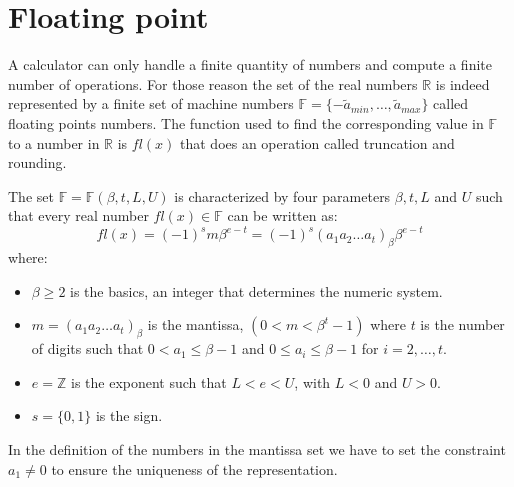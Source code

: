 \documentclass[12pt, a4paper]{report}
\theoremstyle{remark}
\begin{document}
\section{Floating point}
A calculator can only handle a finite quantity of numbers and compute a finite number of operations. For those reason the set of the real numbers 
$\mathbb{R}$ is indeed represented by a finite set of machine numbers $\mathbb{F}=\{-\tilde{a}_{min}, \dots , \tilde{a}_{max} \}$ called
floating points numbers. The function used to find the corresponding value in $\mathbb{F}$ to a number in $\mathbb{R}$ is $fl(x)$ that does an 
operation called truncation and rounding.

The set $\mathbb{F}=\mathbb{F}(\beta,t,L,U)$ is characterized by four parameters $\beta,t,L$ and $U$ such that every real number $fl(x) \in \mathbb{F}$ 
can be written as:
\[fl(x)=(-1)^sm\beta^{e-t}=(-1)^s(a_1a_2\dots a_t)_{\beta}\beta^{e-t}\]
where:
\begin{itemize}
    \item $\beta \geq 2$ is the basics, an integer that determines the numeric system. 
    \item $m=(a_1a_2\dots a_t)_{\beta}$ is the mantissa, $(0<m<\beta^t-1)$ where $t$ is the number of digits such that $0<a_1 \leq \beta - 1$
        and $0 \leq a_i \leq \beta - 1$ for $i=2, \dots, t$. 
    \item $e=\mathbb{Z}$ is the exponent such that $L<e<U$, with $L<0$ and $U>0$. 
    \item $s=\{0,1\}$ is the sign. 
\end{itemize}
In the definition of the numbers in the mantissa set we have to set the constraint $a_1 \neq 0$ to ensure the uniqueness of the representation. 
\end{document}
